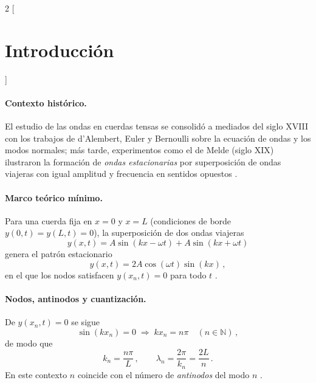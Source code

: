 \begin{multicols}{2}
[\section*{Introducción}]

\paragraph{Contexto histórico.}
El estudio de las ondas en cuerdas tensas se consolidó a mediados del siglo XVIII con los trabajos de d’Alembert, Euler y Bernoulli sobre la ecuación de ondas y los modos normales; más tarde, experimentos como el de Melde (siglo XIX) ilustraron la formación de \emph{ondas estacionarias} por superposición de ondas viajeras con igual amplitud y frecuencia en sentidos opuestos \parencite{FeynmanI49,BritannicaStandingWaves,MeldeWiki}.

\paragraph{Marco teórico mínimo.}
Para una cuerda fija en $x=0$ y $x=L$ (condiciones de borde $y(0,t)=y(L,t)=0$), la superposición de dos ondas viajeras
\begin{equation*}
y(x,t)=A\sin(kx-\omega t)+A\sin(kx+\omega t)
\end{equation*}
genera el patrón estacionario
\begin{equation}
y(x,t)=2A\cos(\omega t)\sin(kx)\,, \label{eqcuerda}
\end{equation}
en el que los nodos satisfacen $y(x_n,t)=0$ para todo $t$ \parencite{OpenStax16-2,MIT8.03Lec9}.

\paragraph{Nodos, antinodos y cuantización.}
De $y(x_n,t)=0$ se sigue
\begin{equation*}
\sin(kx_n)=0 \;\Longrightarrow\; kx_n=n\pi \quad (n\in\mathbb{N})\,,
\end{equation*}
de modo que
\begin{equation*}
k_n=\frac{n\pi}{L}\,, \qquad \lambda_n=\frac{2\pi}{k_n}=\frac{2L}{n}\,.
\end{equation*}
En este contexto $n$ coincide con el número de \emph{antinodos} del modo $n$ \parencite{OpenStax16-6,FeynmanI49}.


\end{multicols}

